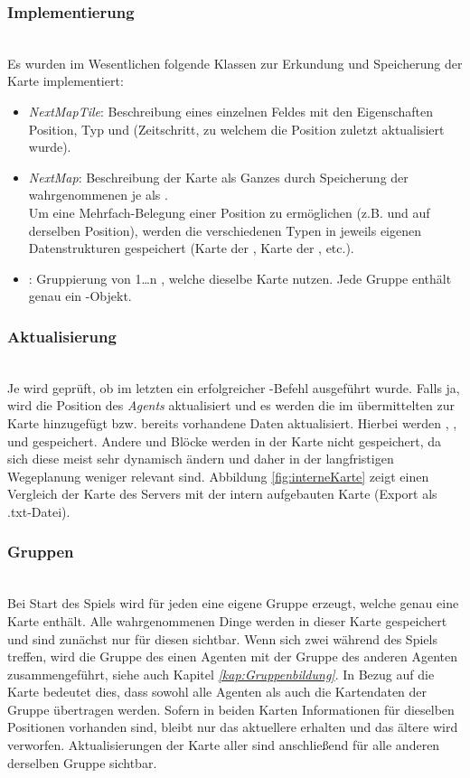\subsubsection{Implementierung} ~\\
Es wurden im Wesentlichen folgende Klassen zur Erkundung und Speicherung der Karte implementiert:
\begin{itemize}
	\item \textit{NextMapTile}: Beschreibung eines einzelnen Feldes mit den Eigenschaften Position, Typ und \Step (Zeitschritt, zu welchem die Position zuletzt aktualisiert wurde).   
	\item \textit{NextMap}: Beschreibung der Karte als Ganzes durch Speicherung der wahrgenommenen \Things je \Step als \NextMapTiles. \\ Um eine Mehrfach-Belegung einer Position zu ermöglichen (z.B. \GoalZone und \Obstacle auf derselben Position), werden die verschiedenen Typen in jeweils eigenen Datenstrukturen gespeichert (Karte der \Obstacles, Karte der \GoalZones, etc.).
	\item \textit{\NextGroup}: Gruppierung von 1…n \Agents, welche dieselbe Karte nutzen. Jede Gruppe enthält genau ein \NextMap-Objekt. 
\end{itemize}

\subsubsection{Aktualisierung} ~\\
Je \Agent wird geprüft, ob im letzten \Step ein erfolgreicher \move-Befehl ausgeführt wurde. Falls ja, wird die Position des \textit{Agents} aktualisiert und es werden die im \Percept übermittelten \Things zur Karte hinzugefügt bzw. bereits vorhandene Daten aktualisiert. Hierbei werden \Dispenser, \GoalZones, \RoleZones und \Obstacles gespeichert. Andere \Agents und Blöcke werden in der Karte nicht gespeichert, da sich diese meist sehr dynamisch ändern und daher in der langfristigen Wegeplanung weniger relevant sind. Abbildung \ref{fig:interneKarte} zeigt einen Vergleich der Karte des Servers mit der intern aufgebauten Karte (Export als .txt-Datei).

\subsubsection{Gruppen} ~\\
Bei Start des Spiels wird für jeden \Agent eine eigene Gruppe erzeugt, welche genau eine Karte enthält. Alle wahrgenommenen Dinge werden in dieser Karte gespeichert und sind zunächst nur für diesen \Agent sichtbar. Wenn sich zwei \Agents während des Spiels treffen, wird die Gruppe des einen Agenten mit der Gruppe des anderen Agenten zusammengeführt, siehe auch Kapitel \textit{\ref{kap:Gruppenbildung}}. In Bezug auf die Karte bedeutet dies, dass sowohl alle Agenten als auch die Kartendaten der Gruppe übertragen werden. Sofern in beiden Karten Informationen für dieselben Positionen vorhanden sind, bleibt nur das aktuellere \NextMapTile erhalten und das ältere wird verworfen. Aktualisierungen der Karte aller \Agents sind anschließend für alle anderen \Agents derselben Gruppe sichtbar. \newline

